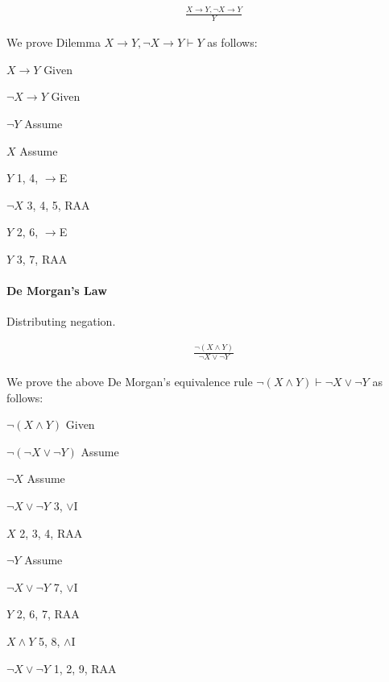 \documentclass{article}
\newcommand{\indentitem}{\addtolength\itemindent{20pt}}
\theoremstyle{plain}
\theoremstyle{definition}
\begin{document}
\begin{multicols}{2}
\begin{align*}
 &\frac{X \rightarrow Y, \lnot X \rightarrow Y}{Y}
\end{align*}  

\noindent We prove Dilemma $X \rightarrow Y, \lnot X \rightarrow Y \vdash Y$ as follows:

\begin{enumerate}
\item $X \rightarrow Y$ \hfill Given
\item $\lnot X \rightarrow Y$ \hfill Given
{\indentitem
\item $\lnot Y$ \hfill Assume
{\indentitem
\item $X$ \hfill Assume
\item $Y$ \hfill 1, 4, $\rightarrow$E
}
\item $\lnot X$ \hfill 3, 4, 5, RAA
\item $Y$ \hfill 2, 6, $\rightarrow$E
}
\item $Y$ \hfill 3, 7, RAA
\end{enumerate}

\paragraph{De Morgan's Law} Distributing negation.

\begin{align*}
 &\frac{\lnot (X \land Y)}{\lnot X \lor \lnot Y}
\end{align*}  

\noindent We prove the above De Morgan's equivalence rule $\lnot (X \land Y) \vdash \lnot X \lor \lnot Y$ as follows:

\begin{enumerate}
\item $\lnot (X \land Y)$ \hfill Given
{\indentitem
\item $\lnot (\lnot X \lor \lnot Y)$ \hfill Assume
{\indentitem
\item $\lnot X$ \hfill Assume
\item $\lnot X \lor \lnot Y$ \hfill 3, $\lor$I
}
\item $X$ \hfill 2, 3, 4, RAA
{\indentitem
\item $\lnot Y$ \hfill Assume
\item $\lnot X \lor \lnot Y$ \hfill 7, $\lor$I
}
\item $Y$ \hfill 2, 6, 7, RAA
\item $X \land Y$ \hfill 5, 8, $\land$I
}
\item $\lnot X \lor \lnot Y$ \hfill 1, 2, 9, RAA


\end{enumerate}
\end{multicols}
\end{document}
